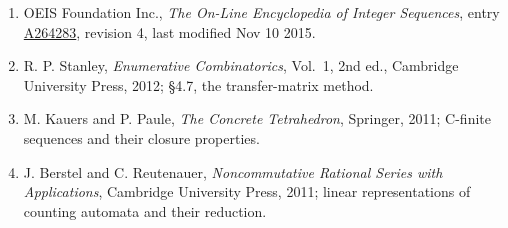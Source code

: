 \documentclass[11pt]{article}
\theoremstyle{definition}
\begin{document}
\begin{enumerate}

\item OEIS Foundation Inc., \emph{The On-Line Encyclopedia of Integer Sequences}, entry \href{https://oeis.org/A264283}{A264283}, revision 4, last modified Nov 10 2015.

\item R. P. Stanley, \emph{Enumerative Combinatorics}, Vol.~1, 2nd ed., Cambridge University Press, 2012; \S4.7, the transfer-matrix method.

\item M. Kauers and P. Paule, \emph{The Concrete Tetrahedron}, Springer, 2011; C-finite sequences and their closure properties.

\item J. Berstel and C. Reutenauer, \emph{Noncommutative Rational Series with Applications}, Cambridge University Press, 2011; linear representations of counting automata and their reduction.

\end{enumerate}
\end{document}

